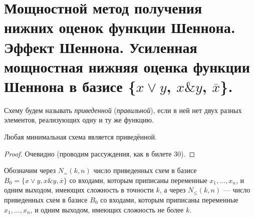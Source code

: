 \section{Мощностной метод получения нижних оценок функции Шеннона. Эффект Шеннона. Усиленная мощностная нижняя оценка функции Шеннона в базисе \{$x\vee y$, $x \& y$, $\overline{x}$\}.}

\begin{definition}
    Схему будем называть \textit{приведенной} (\textit{правильной}), если в ней нет двух разных элементов, реализующих одну и ту же функцию.
\end{definition}

\begin{lemma}
    Любая минимальная схема является приведённой.
\end{lemma}

\begin{proof}
    Очевидно (проводим рассуждения, как в билете 30).
\end{proof}

Обозначим через $N_=(k, n)$ число приведенных схем в базисе $B_0 = \{x \vee y, x\&y, \overline{x}\}$ со входами, которым приписаны переменные $x_1, \ldots, x_n$, и одним выходом, имеющих сложность в точности $k$, а через $N_{\leqslant}(k, n)$ --- число приведенных схем в базисе $B_0$ со входами, которым приписаны переменные $x_1, \ldots, x_n$, и одним выходом, имеющих сложность не более $k$.

